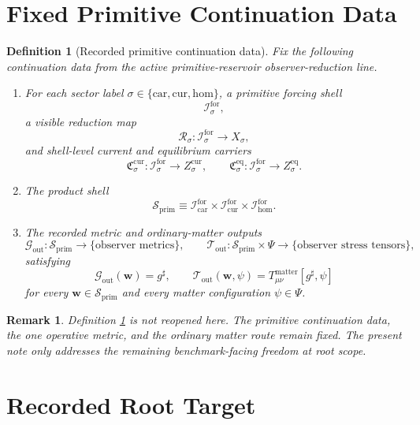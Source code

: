 \documentclass[11pt]{article}
\newcommand{\CompletedMetric}{g^{\sharp}}
\newcommand{\MatterSpace}{\Psi}
\newcommand{\Car}{\mathrm{car}}
\newcommand{\Cur}{\mathrm{cur}}
\newcommand{\Hom}{\mathrm{hom}}
\newcommand{\ForSpace}[1]{\mathcal I_{#1}^{\mathrm{for}}}
\newcommand{\PrimShell}{\mathcal S_{\mathrm{prim}}}
\newcommand{\Reduction}[1]{\mathcal R_{#1}}
\newcommand{\CurrentCarrier}[1]{\mathfrak C_{#1}^{\mathrm{cur}}}
\newcommand{\EqCarrier}[1]{\mathfrak C_{#1}^{\mathrm{eq}}}
\newcommand{\MetricOut}{\mathscr G_{\mathrm{out}}}
\newcommand{\MatterOut}{\mathscr T_{\mathrm{out}}}
\newtheorem{definition}{Definition}
\newtheorem{remark}{Remark}
\begin{document}
\section{Fixed Primitive Continuation Data}

\begin{definition}[Recorded primitive continuation data]
\label{def:fixed}
Fix the following continuation data from the active primitive-reservoir observer-reduction line.
\begin{enumerate}
    \item For each sector label \(\sigma\in\{\Car,\Cur,\Hom\}\), a primitive forcing shell
    \[
    \ForSpace{\sigma},
    \]
    a visible reduction map
    \[
    \Reduction{\sigma}:\ForSpace{\sigma}\to X_{\sigma},
    \]
    and shell-level current and equilibrium carriers
    \[
    \CurrentCarrier{\sigma}:\ForSpace{\sigma}\to Z_{\sigma}^{\mathrm{cur}},
    \qquad
    \EqCarrier{\sigma}:\ForSpace{\sigma}\to Z_{\sigma}^{\mathrm{eq}}.
    \]
    \item The product shell
    \[
    \PrimShell
    \equiv
    \ForSpace{\Car}\times \ForSpace{\Cur}\times \ForSpace{\Hom}.
    \]
    \item The recorded metric and ordinary-matter outputs
    \[
    \MetricOut:\PrimShell\to\{\text{observer metrics}\},
    \qquad
    \MatterOut:\PrimShell\times\MatterSpace\to\{\text{observer stress tensors}\},
    \]
    satisfying
    \begin{equation}
    \MetricOut(\mathbf w)=\CompletedMetric,
    \qquad
    \MatterOut(\mathbf w,\psi)
    =
    T_{\mu\nu}^{\mathrm{matter}}[\CompletedMetric,\psi]
    \label{eq:fixedoutputs}
    \end{equation}
    for every \(\mathbf w\in\PrimShell\) and every matter configuration \(\psi\in\MatterSpace\).
\end{enumerate}
\end{definition}

\begin{remark}
Definition \ref{def:fixed} is not reopened here. The primitive continuation data, the one operative metric, and the ordinary matter route remain fixed. The present note only addresses the remaining benchmark-facing freedom at root scope.
\end{remark}

\section{Recorded Root Target}
\end{document}
